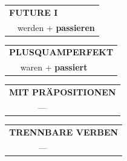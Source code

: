 \documentclass[10pt,a4paper]{revtex4-2}
\begin{document}
\begin{verbbox}
\begin{tabular}{rl}
    \multicolumn{2}{l}{\textbf{FUTURE I} }\\
   & werden + \textbf{passieren}\\
 
  \end{tabular}
\hfill
   \begin{tabular}{rl}
      \multicolumn{2}{l}{\textbf{PLUSQUAMPERFEKT}}\\
   & waren + \textbf{passiert}\\
  \end{tabular}
  
  \vspace{10pt}



\begin{tabular}{lll}
\multicolumn{3}{l}{\textbf{MIT PRÄPOSITIONEN}}\\
& ---\\
\end{tabular}
\hfill
\begin{tabular}{lll}
\multicolumn{3}{l}{\textbf{TRENNBARE VERBEN}}\\
& ---\\
\end{tabular}

\vspace{-5pt}

\end{verbbox}
\end{document}
